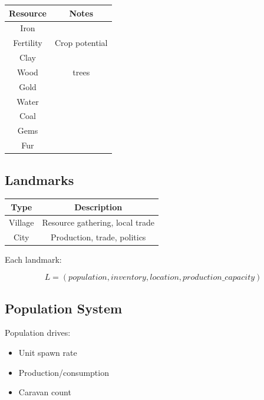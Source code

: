 \documentclass[a4paper,12pt]{article}
\begin{document}
\begin{table}[H]
\centering
\begin{tabular}{|c|c|}
\hline
Resource & Notes \\
\hline
Iron &  \\
Fertility & Crop potential \\
Clay &  \\
Wood & trees \\
Gold &  \\
Water &  \\
Coal &  \\
Gems &  \\
Fur &  \\
\hline
\end{tabular}
\end{table}



\subsection{Landmarks}

\begin{table}[H]
\centering
\begin{tabular}{|c|c|}
\hline
Type & Description \\
\hline
Village & Resource gathering, local trade \\
City & Production, trade, politics \\
\hline
\end{tabular}
\end{table}

Each landmark:

\begin{equation}
L = (population, inventory, location, production\_capacity)
\end{equation}



\subsection{Population System}

Population drives:

\begin{itemize}
\item Unit spawn rate
\item Production/consumption
\item Caravan count
\end{itemize}
\end{document}
